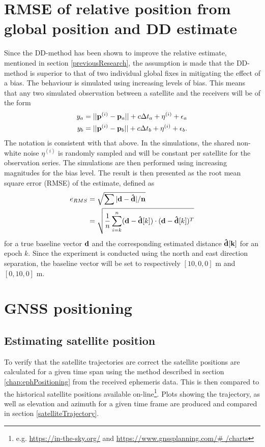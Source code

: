 \section{RMSE of relative position from global position and DD estimate }\label{RMSE}
Since the DD-method has been shown to improve the relative estimate, mentioned in section \ref{previousResearch}, the assumption is made that the DD-method is superior to that of two individual global fixes in mitigating the effect of a bias. The behaviour is simulated using increasing levels of bias. This means that any two simulated observation between a satellite and the receivers will be of the form 
\begin{align}
y_a&=||{\bf p}^{(i)}-{\bf p}_{a}||+c\Delta t_a+\eta^{(i)}+ \epsilon_a\\
y_b&=||{\bf p}^{(i)}-{\bf p}_{b}||+c\Delta t_b+\eta^{(i)}+\epsilon_b.
\end{align}
The notation is consistent with that above. In the simulations, the shared non-white noise $\eta^{(i)}$ is randomly sampled and will be constant per satellite for the observation series. The simulations are then performed using increasing magnitudes for the bias level. The result is then presented as the root mean square error (RMSE) of the estimate, defined as
\begin{align}
e_{RMS}	&=\sqrt{\sum   |\bf d-\hat{d}|/n} \nonumber \\
		&=\sqrt{\frac{1}{n}\sum_{i=k}^{n} ({\bf d-\hat{d}}[k])\cdot ({\bf d-\hat{d}}[k])^T} \label{eqERMS}
\end{align} 
for a true baseline vector $\bf d$ and the corresponding estimated distance $\bf \hat{d}[k]$ for an epoch $k$. Since the experiment is conducted using the north and east direction separation, the baseline vector will be set to respectively $[10, 0,0]$ m and $[0, 10, 0]$ m.


\section{GNSS positioning}

\subsection{Estimating satellite position}
To verify that the satellite trajectories are correct the satellite positions are calculated for a given time span using the method described in section \ref{chap:ephPositioning} from the received ephemeris data. This is then compared to the historical satellite positions available on-line\footnote{e.g. \url{https://in-the-sky.org/} and \url{https://www.gnssplanning.com/\# /charts}}. Plots showing the trajectory, as well as elevation and azimuth for a given time frame are produced and compared in section \ref{satelliteTrajectory}. 

